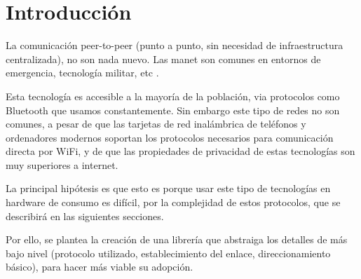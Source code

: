 \chapter{Introducción}

La comunicación peer-to-peer (punto a punto, sin necesidad de infraestructura
centralizada), no son nada nuevo. Las \gls{manet} son comunes en entornos de
emergencia, tecnología militar, etc \cite{wiki:manet_applications}.

Esta tecnología es accesible a la mayoría de la población, via protocolos como
Bluetooth que usamos constantemente. Sin embargo este tipo de redes no son
comunes, a pesar de que las tarjetas de red inalámbrica de teléfonos y
ordenadores modernos soportan los protocolos necesarios para comunicación
directa por WiFi, y de que las propiedades de privacidad de estas tecnologías
son muy superiores a internet.

La principal hipótesis es que esto es porque usar este tipo de tecnologías en
hardware de consumo es difícil, por la complejidad de estos protocolos, que se
describirá en las siguientes secciones.

Por ello, se plantea la creación de una librería que abstraiga los detalles de
más bajo nivel (protocolo utilizado, establecimiento del enlace,
direccionamiento básico), para hacer más viable su adopción.

